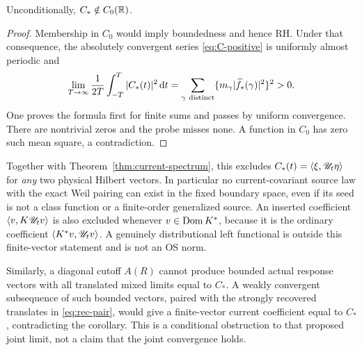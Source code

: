 \begin{corollary}\label{cor:nondecay}
Unconditionally, $C_*\notin C_0(\mathbb R)$.
\end{corollary}
\begin{proof}
Membership in $C_0$ would imply boundedness and hence RH.
Under that consequence, the absolutely convergent series
\eqref{eq:C-positive} is uniformly almost periodic and
\[
\lim_{T\to\infty}\frac1{2T}\int_{-T}^T|C_*(t)|^2\,\mathrm d t
=\sum_{\gamma\ {\rm distinct}}
\{m_\gamma|\widehat f_*(\gamma)|^2\}^2>0.
\]
One proves the formula first for finite sums and passes
by uniform convergence. There are nontrivial zeros and
the probe misses none. A function in $C_0$ has zero such
mean square, a contradiction.
\end{proof}
Together with Theorem~\ref{thm:current-spectrum}, this
excludes $C_*(t)=\langle \xi,\mathscr U_t\eta\rangle$ for \emph{any} two
physical Hilbert vectors. In particular no current-covariant
source law with the exact Weil pairing can exist in the
fixed boundary space, even if its seed is not a class
function or a finite-order generalized source.
An inserted coefficient $\langle v,K\mathscr U_tv\rangle$ is also excluded
whenever $v\in\operatorname{Dom} K^*$, because it is the ordinary
coefficient $\langle K^*v,\mathscr U_tv\rangle$.
A genuinely distributional left functional is outside
this finite-vector statement and is not an OS norm.

Similarly, a diagonal cutoff $A(R)$ cannot produce
bounded actual response vectors with all translated
mixed limits equal to $C_*$. A weakly convergent
subsequence of such bounded vectors, paired with the
strongly recovered translates in \eqref{eq:rec-pair},
would give a finite-vector current coefficient equal
to $C_*$, contradicting the corollary. This is a
conditional obstruction to that proposed joint limit,
not a claim that the joint convergence holds.

